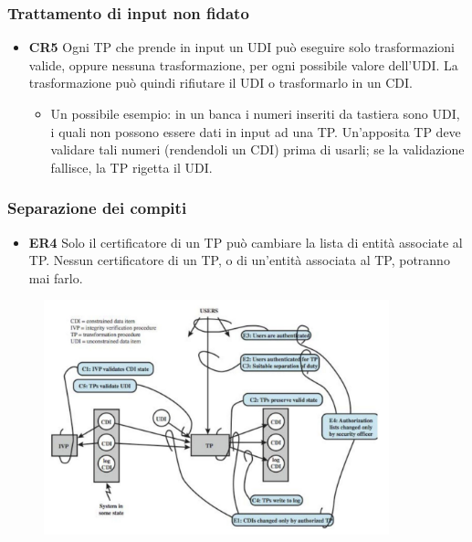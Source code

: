 \subsubsection{Trattamento di input non fidato}

\begin{itemize}
      \item \textbf{CR5} Ogni TP che prende in input un UDI può eseguire solo
            trasformazioni valide, oppure
            nessuna trasformazione, per ogni possibile valore dell’UDI.
            La trasformazione può quindi rifiutare il
            UDI o trasformarlo in un CDI.
            \begin{itemize}
                  \item Un possibile esempio: in un banca i numeri inseriti
                        da tastiera sono UDI, i quali non possono essere dati in input
                        ad una TP. Un’apposita TP deve validare tali numeri
                        (rendendoli un CDI) prima di usarli; se
                        la validazione fallisce, la TP rigetta il UDI.
            \end{itemize}
\end{itemize}

\subsubsection{Separazione dei compiti}

\begin{itemize}
      \item \textbf{ER4} Solo il certificatore di un TP può cambiare la lista di
            entità associate al TP. Nessun
            certificatore di un TP, o di un’entità associata al TP, potranno mai
            farlo.
\end{itemize}

\begin{figure}[H]
      \centering
      \includegraphics[width=10cm, keepaspectratio]{capitoli/policy/imgs/clark_wilson5.png}
\end{figure}

